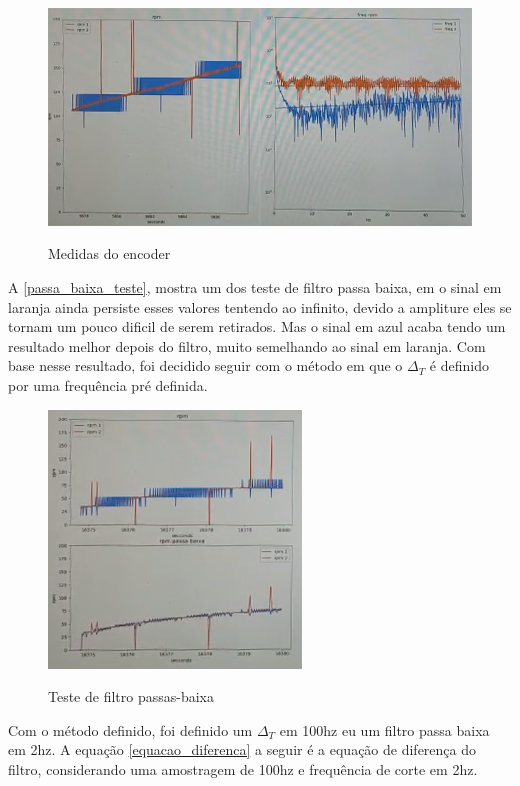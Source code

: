 \begin{figure}[ht]
    \centering
    \caption{Medidas do encoder}
    \includegraphics[width=1\textwidth]{figures/medidas_altas}
    \label{medidas_altas}
\end{figure}


A \autoref{passa_baixa_teste}, mostra um dos teste de filtro passa baixa,
em o sinal em laranja ainda persiste esses valores tentendo ao infinito, 
devido a ampliture eles se tornam um pouco dificil de serem retirados.
Mas o sinal em azul acaba tendo um resultado melhor depois do filtro, muito semelhando ao sinal em laranja.
Com base nesse resultado, foi decidido seguir com o método em que o $\Delta_{T}$ é definido por uma frequência pré definida.

\begin{figure}[ht]
    \centering
    \caption{Teste de filtro passas-baixa}
    \includegraphics[width=0.6\textwidth]{figures/passa_baixa_teste}
    \label{passa_baixa_teste}
\end{figure}


Com o método definido, foi definido um $\Delta_{T}$ em 100hz eu um filtro passa baixa em 2hz.
A equação \eqref{equacao_diferenca} a seguir é a equação de diferença do filtro, considerando uma amostragem de 100hz e frequência de corte em 2hz.

